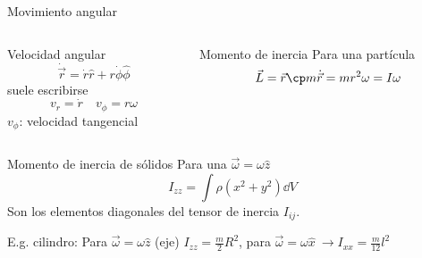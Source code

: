 \documentclass[serif]{beamer}
\begin{document}
\begin{frame}{Movimiento angular}
\begin{columns}[c]
	\begin{column}{0.45\textwidth}
		\begin{block}{Velocidad angular}
		\[
			\dot{\vec{r}} = \dot{r} \hat{r} + r \dot{\phi} \hat{\phi}
		\]
		suele escribirse
		\[ v_r = \dot{r} \quad v_\phi= r \omega \]
		\(v_\phi\): velocidad tangencial
		\end{block}
	\end{column}

	\pause

	\begin{column}{0.45\textwidth}
		\begin{block}{Momento de inercia}
			Para una partícula
			\[
				\vec{L}= \vec{r} \cp m \dot{\vec{r}} = m r^2 \omega= I \omega
			\]
		\end{block}
	\end{column}
\end{columns}
	
	\pause
	\begin{block}{Momento de inercia de sólidos}
		Para una \(\vec{\omega}= \omega \hat{z}\)
		\[
			I_{zz}= \int \rho(x^2+y^2) \dd{V}
		\]
		Son los elementos diagonales del tensor de inercia \(I_{ij}\).

		E.g. cilindro: Para \(\vec{\omega}= \omega \hat{z}\) (eje) \(I_{zz}= \frac{m}{2}R^2\), para \(\vec{\omega}= \omega \hat{x}\ \rightarrow I_{xx}= \frac{m}{12} l^2\)
	\end{block}

\end{frame}
\end{document}
